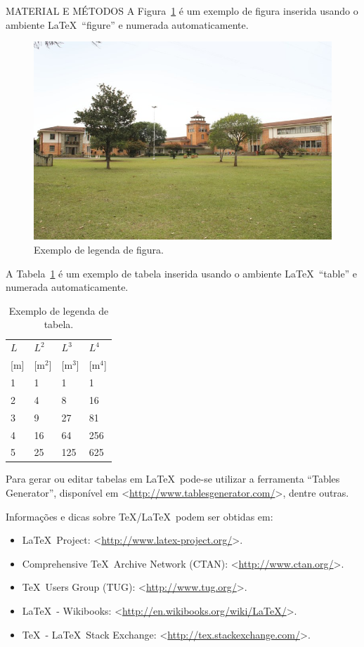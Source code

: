\documentclass[final]{beamer}
\begin{document}
\begin{frame}[t, fragile = singleslide]{}
\begin{columns}[t]
\begin{column}{0.45\textwidth}
\begin{block}{MATERIAL E MÉTODOS}
A Figura~\ref{fig:campuspontagrossa} é um exemplo de figura inserida usando o ambiente \LaTeX\ ``figure'' e numerada automaticamente.
\begin{figure}[!htb]
\centering
\caption{Exemplo de legenda de figura.}
\label{fig:campuspontagrossa}
\includegraphics[width = 0.675\columnwidth]{./Figuras/campuspontagrossa}
\end{figure}
A Tabela~\ref{tab:Ldimensoes} é um exemplo de tabela inserida usando o ambiente \LaTeX\ ``table'' e numerada automaticamente.
\begin{table}[!htb]
\centering\small
\caption{Exemplo de legenda de tabela.}
\label{tab:Ldimensoes}
\begin{tabular*}{\columnwidth}{@{\extracolsep{\fill}}llll}
\hline
$L$   & $L^2$     & $L^3$     & $L^4$     \\
{[m]} & {[m$^2$]} & {[m$^3$]} & {[m$^4$]} \\ \hline
1     & 1         & 1         & 1         \\
2     & 4         & 8         & 16        \\
3     & 9         & 27        & 81        \\
4     & 16        & 64        & 256       \\
5     & 25        & 125       & 625       \\ \hline
\end{tabular*}
\end{table}
Para gerar ou editar tabelas em \LaTeX\ pode-se utilizar a ferramenta ``Tables Generator'', disponível em <\url{http://www.tablesgenerator.com/}>, dentre outras.\par
Informações e dicas sobre \TeX/\LaTeX\ podem ser obtidas em:
\begin{itemize}
\item \LaTeX\ Project: <\url{http://www.latex-project.org/}>.
\item Comprehensive \TeX\ Archive Network (CTAN): <\url{http://www.ctan.org/}>.
\item \TeX\ Users Group (TUG): <\url{http://www.tug.org/}>.
\item \LaTeX\ - Wikibooks: <\url{http://en.wikibooks.org/wiki/LaTeX/}>.
\item \TeX\ - \LaTeX\ Stack Exchange: <\url{http://tex.stackexchange.com/}>.
\end{itemize}
\end{block}


\end{column}
\end{columns}
\end{frame}
\end{document}
